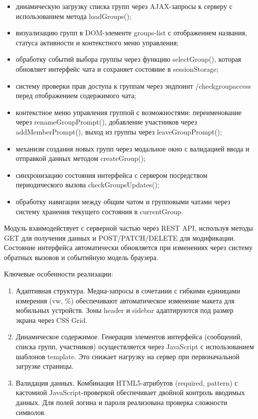 \begin{itemize}
	\item динамическую загрузку списка групп через AJAX-запросы к серверу с использованием метода loadGroups();
	\item визуализацию групп в DOM-элементе groups-list с отображением названия, статуса активности и контекстного меню управления;
	\item обработку событий выбора группы через функцию selectGroup(), которая обновляет интерфейс чата и сохраняет состояние в sessionStorage;
	\item систему проверки прав доступа к группам через эндпоинт /checkgroupaccess перед отображением содержимого чата;
	\item контекстное меню управления группой с возможностями: переименование через renameGroupPrompt(), добавление участников через addMemberPrompt(), выход из группы через leaveGroupPrompt();
	\item механизм создания новых групп через модальное окно с валидацией ввода и отправкой данных методом createGroup();
	\item синхронизацию состояния интерфейса с сервером посредством периодического вызова checkGroupsUpdates();
	\item обработку навигации между общим чатом и групповыми чатами через систему хранения текущего состояния в currentGroup.
\end{itemize}

Модуль взаимодействует с серверной частью через REST API, используя методы GET для получения данных и POST/PATCH/DELETE для модификации. Состояние интерфейса автоматически обновляется при изменениях через систему обратных вызовов и событийную модель браузера.

Ключевые особенности реализации:  
\begin{enumerate}
	\item Адаптивная структура. Медиа-запросы в сочетании с гибкими единицами измерения (vw, \%) обеспечивают автоматическое изменение макета для мобильных устройств. Зоны header и sidebar адаптируются под размер экрана через CSS Grid.
	
	\item Динамическое содержимое. Генерация элементов интерфейса (сообщений, списка групп, участников) осуществляется через JavaScript с использованием шаблонов template. Это снижает нагрузку на сервер при первоначальной загрузке страницы.
	
	\item Валидация данных. Комбинация HTML5-атрибутов (required, pattern) с кастомной JavaScript-проверкой обеспечивает двойной контроль вводимых данных. Для полей логина и пароля реализована проверка сложности символов.
\end{enumerate}

